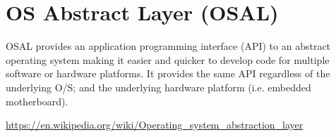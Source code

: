 \chapter{OS Abstract Layer (OSAL)}

OSAL provides an application programming interface (API) to an abstract
operating system making it easier and quicker to develop code for multiple
software or hardware platforms. It provides the same API regardless of the
underlying O/S; and the underlying hardware platform (i.e. embedded
motherboard).

\url{https://en.wikipedia.org/wiki/Operating_system_abstraction_layer}